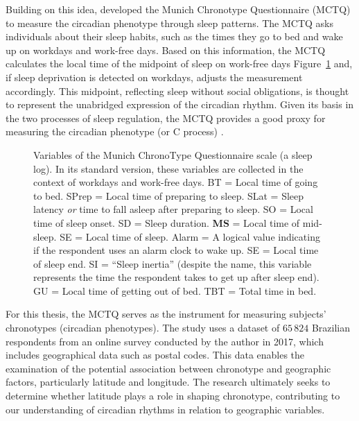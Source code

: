 \documentclass[
12pt,
openright,
oneside,
a4paper,
chapter=TITLE,
section=TITLE,
french,
spanish,
brazil,
english
]{abntex2}\usepackage{array}
\begin{document}
Building on this idea, \textcite{roenneberg2003} developed the Munich
Chronotype Questionnaire (MCTQ) to measure the circadian phenotype
through sleep patterns. The MCTQ asks individuals about their sleep
habits, such as the times they go to bed and wake up on workdays and
work-free days. Based on this information, the MCTQ calculates the local
time of the midpoint of sleep on work-free days
Figure~\ref{fig-chapter-2-mctq-variables} and, if sleep deprivation is
detected on workdays, adjusts the measurement accordingly. This
midpoint, reflecting sleep without social obligations, is thought to
represent the unabridged expression of the circadian rhythm. Given its
basis in the two processes of sleep regulation, the MCTQ provides a good
proxy for measuring the circadian phenotype (or \(\text{C}\) process)
\autocite{leocadio-miguel2014}.

\begin{figure}[H]

\caption{\label{fig-chapter-2-mctq-variables}Variables of the Munich
ChronoType Questionnaire scale (a sleep log). In its standard version,
these variables are collected in the context of workdays and work-free
days. BT = Local time of going to bed. SPrep = Local time of preparing
to sleep. SLat = Sleep latency \emph{or} time to fall asleep after
preparing to sleep. SO = Local time of sleep onset. SD = Sleep duration.
\textbf{MS} = Local time of mid-sleep. SE = Local time of sleep. Alarm =
A logical value indicating if the respondent uses an alarm clock to wake
up. SE = Local time of sleep end. SI = ``Sleep inertia'' (despite the
name, this variable represents the time the respondent takes to get up
after sleep end). GU = Local time of getting out of bed. TBT = Total
time in bed.}


\end{figure}%

For this thesis, the MCTQ serves as the instrument for measuring
subjects' chronotypes (circadian phenotypes). The study uses a dataset
of \(65\,824\) Brazilian respondents from an online survey conducted by
the author in 2017, which includes geographical data such as postal
codes. This data enables the examination of the potential association
between chronotype and geographic factors, particularly latitude and
longitude. The research ultimately seeks to determine whether latitude
plays a role in shaping chronotype, contributing to our understanding of
circadian rhythms in relation to geographic variables.
\end{document}
